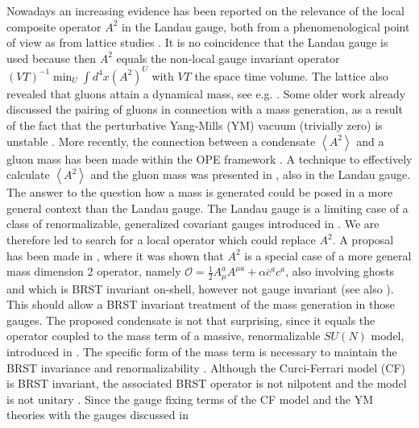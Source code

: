 \documentclass[a4paper,12pt]{article}
\begin{document}
Nowadays an increasing evidence has been reported on the relevance
of the local composite operator $A^{2}$ in the Landau gauge, both
from a phenomenological point of view
\cite{Gubarev:2000eu,Gubarev:2000nz} as from lattice studies
\cite{Boucaud:2002nc,Boucaud:2001st,Burgio:1997hc}. It is no
coincidence that the Landau gauge is used because then $A^{2}$
equals the non-local gauge invariant operator
$(VT)^{-1}\min_{U}\int d^{4}x \left(A^{2}\right)^{U}$ with $VT$
the space time volume. The lattice also revealed that gluons
attain a dynamical mass, see e.g. \cite
{Langfeld:2001cz,Alexandrou:2001fh}. Some older work already
discussed the pairing of gluons in connection with a mass
generation, as a result of the fact that the perturbative
Yang-Mills (YM) vacuum (trivially zero) is unstable
\cite{Fukuda:1977mz,Fukuda:1977zp,Gusynin:1978tr}. More recently,
the connection between a condensate $\left\langle
A^{2}\right\rangle$ and a gluon mass has been made within the OPE
framework \cite{Kondo:2001nq,kmsi}. A technique to effectively
calculate $\left\langle A^{2}\right\rangle$ and the gluon mass was
presented in \cite{v1}, also in the Landau gauge. \newline
\newline
The answer to the question how a mass is generated could be posed in a more
general context than the Landau gauge. The Landau gauge is a limiting case
of a class of renormalizable, generalized covariant gauges introduced in
\cite{Delbourgo:1981cm,Baulieu:sb}. We are therefore led to search for a
local operator which could replace $A^{2}$. A proposal has been made in \cite
{Kondo:2001nq}, where it was shown that $A^{2}$ is a special case of a more
general mass dimension 2 operator, namely $\mathcal{O}=\frac{1}{2}%
A_{\mu}^{a}A^{\mu a}+\alpha \overline{c}^{a}c^{a}$, also involving
ghosts and which is BRST invariant on-shell, however not gauge
invariant (see also \cite{Gripaios:2003xq}). This should allow a
BRST invariant treatment of the mass generation in those gauges.
The proposed condensate is not that surprising, since it equals
the operator coupled to the mass term of a massive, renormalizable
$SU(N)$ model, introduced in \cite {Curci:bt,Curci:1976ar}. The
specific form of the mass term is necessary to maintain the BRST
invariance and renormalizability \cite
{Curci:bt,Curci:1976ar,deBoer:1995dh}. Although the Curci-Ferrari
model (CF) is BRST invariant, the associated BRST operator is not
nilpotent and the model is not unitary
\cite{Ojima:1981fs,deBoer:1995dh}. Since the gauge fixing terms of
the CF model and the YM theories with the gauges discussed in
\end{document}
